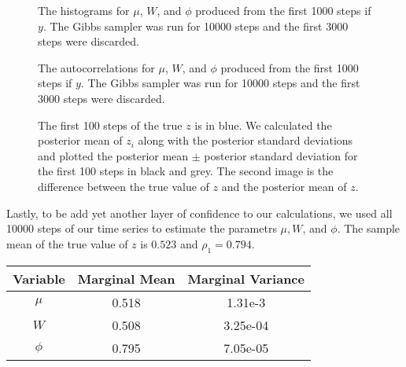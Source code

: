 \documentclass{article}
\begin{document}
\begin{figure}[!h]
\begin{center}
\end{center}
\label{DLM4:histograms}
\caption{The histograms for $\mu$, $W$, and $\phi$ produced from the first 1000 steps if $y$.  The Gibbs sampler was run for 10000 steps and the first 3000 steps were discarded.}
\end{figure}

\begin{figure}[!h]
\begin{center}
\end{center}
\caption{The autocorrelations for $\mu$, $W$, and $\phi$ produced from the first 1000 steps if $y$.  The Gibbs sampler was run for 10000 steps and the first 3000 steps were discarded.}
\end{figure}

\begin{figure}[!h]
\begin{center}
\end{center}
\label{fig:DLM4:z_stuff}
\caption{The first 100 steps of the true $z$ is in blue.  We calculated the posterior mean of $z_i$ along with the posterior standard deviations and plotted the posterior mean $\pm$ posterior standard deviation for the first 100 steps in black and grey.  The second image is the difference between the true value of $z$ and the posterior mean of $z$.}
\end{figure}

Lastly, to be add yet another layer of confidence to our calculations, we used all 10000 steps of our time series to estimate the parametrs $\mu, W$, and $\phi$.  The sample mean of the true value of $z$ is $0.523$ and $\rho_1 = 0.794$.

\begin{center}
\begin{tabular}{c | c | c}
Variable & Marginal Mean & Marginal Variance \\
\hline
$\mu$ & 0.518 & 1.31e-3 \\
$W$ & 0.508 & 3.25e-04 \\
$\phi$ & 0.795 & 7.05e-05 \\
\end{tabular}
\end{center}
\end{document}
